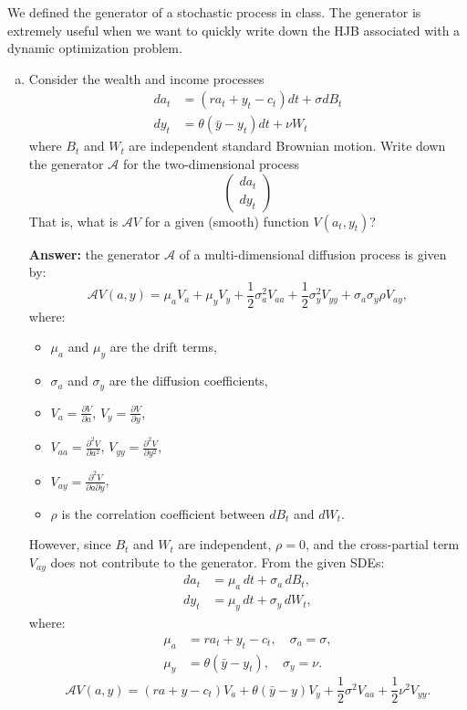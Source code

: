 \documentclass[11pt]{extarticle}
\theoremstyle{plain}
\theoremstyle{definition}
\begin{document}
We defined the generator of a stochastic process in class. The generator is extremely useful when we want to quickly write down the HJB associated with a dynamic optimization problem. 

\vspace{4mm}
\begin{enumerate}[(a)]
\item Consider the wealth and income processes 
\begin{align*}
	da_t &= (ra_t + y_t - c_t)dt + \sigma dB_t \\
	dy_t &= \theta (\bar y - y_t) dt + \nu W_t
\end{align*}
where $B_t$ and $W_t$ are independent standard Brownian motion. Write down the generator $\mathcal A$ for the two-dimensional process
\begin{equation*}
	\begin{pmatrix}
		d a_t \\
		d y_t 
	\end{pmatrix}
\end{equation*}
That is, what is $\mathcal A V$ for a given (smooth) function $V(a_t, y_t)$?

\textbf{Answer:} the generator \( \mathcal{A} \) of a multi-dimensional diffusion process is given by:
\[
\mathcal{A} V(a, y) = \mu_a V_a + \mu_y V_y + \frac{1}{2} \sigma_a^2 V_{aa} + \frac{1}{2} \sigma_y^2 V_{yy} + \sigma_a \sigma_y \rho V_{a y},
\]
where:
\begin{itemize}
    \item \( \mu_a \) and \( \mu_y \) are the drift terms,
    \item \( \sigma_a \) and \( \sigma_y \) are the diffusion coefficients,
    \item \( V_a = \frac{\partial V}{\partial a} \), \( V_y = \frac{\partial V}{\partial y} \),
    \item \( V_{aa} = \frac{\partial^2 V}{\partial a^2} \), \( V_{yy} = \frac{\partial^2 V}{\partial y^2} \),
    \item \( V_{a y} = \frac{\partial^2 V}{\partial a \partial y} \),
    \item \( \rho \) is the correlation coefficient between \( dB_t \) and \( dW_t \).
\end{itemize}
However, since \( B_t \) and \( W_t \) are independent, \( \rho = 0 \), and the cross-partial term \( V_{a y} \) does not contribute to the generator.
From the given SDEs:
\begin{align*}
    da_t &= \mu_a \, dt + \sigma_a \, dB_t, \\
    dy_t &= \mu_y \, dt + \sigma_y \, dW_t,
\end{align*}
where:
\begin{align*}
    \mu_a &= r a_t + y_t - c_t, \quad \sigma_a = \sigma, \\
    \mu_y &= \theta (\bar{y} - y_t), \quad \sigma_y = \nu.
\end{align*}
\[
\mathcal{A} V(a, y) = \left( r a + y - c_t \right) V_a + \theta (\bar{y} - y) V_y + \frac{1}{2} \sigma^2 V_{aa} + \frac{1}{2} \nu^2 V_{yy}.
\]


\end{enumerate}
\end{document}
